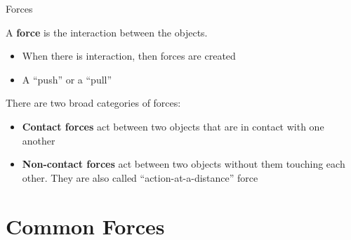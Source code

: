 \documentclass[12pt,compress,aspectratio=169]{beamer}
\newcommand{\pic}[2]{\texttt{[image: \#2]}}
\begin{document}
\begin{frame}{Forces}

  A \textbf{force} is the interaction between the objects.
  \begin{itemize}
  \item When there is interaction, then forces are created
  \item A ``push'' or a ``pull''
  \end{itemize}

  There are two broad categories of forces:
  \begin{itemize}
  \item\textbf{Contact forces} act between two objects that are in contact
    with one another
  \item\textbf{Non-contact forces} act between two objects without them
    touching each other. They are also called ``action-at-a-distance'' force
  \end{itemize}
\end{frame}



%


\section{Common Forces}
\end{document}
